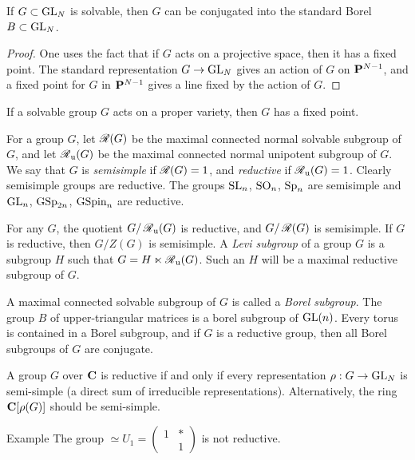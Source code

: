 \begin{theo}
If $G\subset \operatorname{GL}_N$ is solvable, then $G$ can be conjugated 
into the standard Borel $B\subset \operatorname{GL}_N$. 
\end{theo}
\begin{proof}
One uses the fact that if $G$ acts on a projective space, then it has a fixed 
point. The standard representation $G\to \operatorname{GL}_N$ gives an action of 
$G$ on $\mathbf{P}^{N-1}$, and a fixed point for $G$ in $\mathbf{P}^{N-1}$ gives a line fixed 
by the action of $G$. 
\end{proof}

\begin{theo}[Borel]
If a solvable group $G$ acts on a proper variety, then $G$ has a fixed point. 
\end{theo}

For a group $G$, let $\operatorname{\mathscr{R}}(G)$ be the maximal connected normal solvable 
subgroup of $G$, and let $\operatorname{\mathscr{R}}_{\mathrm{u}}(G)$ be the maximal connected normal 
unipotent subgroup of $G$. We say that $G$ is \emph{semisimple} if 
$\operatorname{\mathscr{R}}(G)=1$, and \emph{reductive} if $\operatorname{\mathscr{R}}_{\mathrm{u}}(G)=1$. Clearly 
semisimple groups are reductive. The groups 
$\operatorname{SL}_n$, $\operatorname{SO}_n$, $\operatorname{Sp}_n$ are semisimple 
and $\operatorname{GL}_n$, $\operatorname{GSp}_{2 n}$, $\operatorname{GSpin}_n$ are 
reductive. 

For any $G$, the quotient $G/\operatorname{\mathscr{R}}_{\mathrm{u}}(G)$ is reductive, and 
$G/\operatorname{\mathscr{R}}(G)$ is semisimple. If $G$ is reductive, then $G/Z(G)$ is 
semisimple. A \emph{Levi subgroup} of a group $G$ is a subgroup $H$ such 
that $G=H\ltimes \operatorname{\mathscr{R}}_{\mathrm{u}} (G)$. Such an $H$ will be a maximal 
reductive subgroup of $G$. 

A maximal connected solvable subgroup of $G$ is called a \emph{Borel subgroup}. 
The group $B$ of upper-triangular matrices is a borel subgroup of 
$\operatorname{GL}(n)$. Every torus is contained in a Borel subgroup, and if $G$ 
is a reductive group, then all Borel subgroups of $G$ are conjugate. 

A group $G$ over $\mathbf{C}$ is reductive if and only if every representation 
$\rho:G\to \operatorname{GL}_N$ is semi-simple (a direct sum of irreducible 
representations). Alternatively, the ring $\mathbf{C}[\rho(G)]$ should be semi-simple. 

\begin{enonce}[remark]{Example}
The group $\simeq U_1 = \begin{pmatrix} 1 & \ast \\ & 1 \end{pmatrix}$ 
is not reductive. 
\end{enonce}





